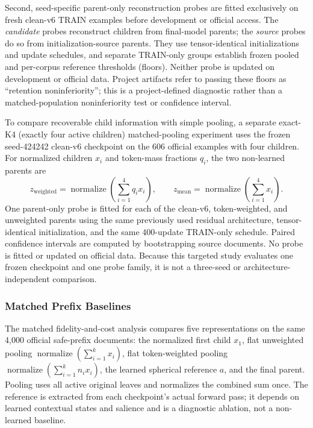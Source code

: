 \documentclass[10pt]{article}
\begin{document}
Second, seed-specific parent-only reconstruction probes are fitted exclusively
on fresh clean-v6 TRAIN examples before development or official access. The
\emph{candidate} probes reconstruct children from final-model parents; the
\emph{source} probes do so from initialization-source parents. They use
tensor-identical initializations and update schedules, and separate TRAIN-only
groups establish frozen pooled and per-corpus reference thresholds (floors).
Neither probe is updated on development or official data. Project artifacts
refer to passing these floors as ``retention noninferiority''; this is a
project-defined diagnostic rather than a matched-population
noninferiority test or confidence interval.

To compare recoverable child information with simple pooling, a separate
exact-K4 (exactly four active children) matched-pooling experiment uses the
frozen seed-424242 clean-v6 checkpoint on the 606 official examples with four
children. For normalized children \(x_i\) and token-mass fractions \(q_i\), the
two non-learned parents are
\[
z_{\mathrm{weighted}}
=
\operatorname{normalize}\!\left(\sum_{i=1}^{4}q_i x_i\right),
\qquad
z_{\mathrm{mean}}
=
\operatorname{normalize}\!\left(\sum_{i=1}^{4}x_i\right).
\]
One parent-only probe is fitted for each of the clean-v6, token-weighted, and
unweighted parents using the same previously used residual architecture, tensor-identical
initialization, and the same 400-update TRAIN-only schedule. Paired confidence
intervals are computed by bootstrapping source documents. No probe is fitted or
updated on official data. Because this targeted study evaluates one frozen
checkpoint and one probe family, it is not a three-seed or
architecture-independent comparison.

\subsubsection{Matched Prefix Baselines}
\label{sec:safe-baseline-protocol}

The matched fidelity-and-cost analysis compares five representations on the same
4,000 official safe-prefix documents: the normalized first child \(x_1\),
flat unweighted pooling \(\operatorname{normalize}(\sum_{i=1}^k x_i)\),
flat token-weighted pooling
\(\operatorname{normalize}(\sum_{i=1}^k n_i x_i)\), the learned spherical
reference \(a\), and the final parent. Pooling uses all active original leaves
and normalizes the combined sum once. The reference is extracted from each
checkpoint's actual forward pass; it depends on learned contextual states and
salience and is a diagnostic ablation, not a non-learned baseline.
\end{document}
